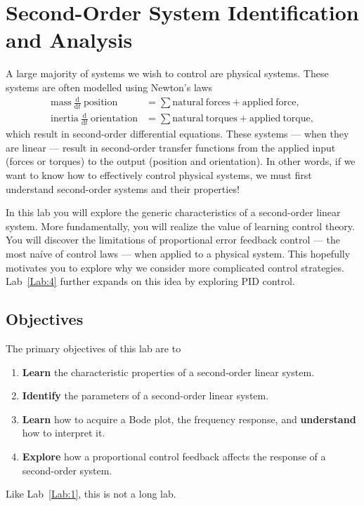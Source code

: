 \chapter{Second-Order System Identification and Analysis}\label{Lab:2}
A large majority of systems we wish to control are physical systems. These
systems are often modelled using Newton's laws
\[
\begin{aligned}
  \mathrm{mass}~\frac{\mathrm d}{\mathrm{d}t}~\mathrm{position}
    &= \sum \mathrm{natural~forces} + \mathrm{applied~force},\\
  \mathrm{inertia}~\frac{\mathrm d}{\mathrm{d}t}~\mathrm{orientation}
    &= \sum \mathrm{natural~torques} + \mathrm{applied~torque},
\end{aligned}
\]
which result in second-order differential equations. These systems --- when
they are linear --- result in second-order transfer functions from the
applied input (forces or torques) to the output (position and orientation).
In other words, if we want to know how to effectively control physical systems,
we must first understand second-order systems and their properties!

In this lab you will explore the generic characteristics of a second-order
linear system. More fundamentally, you will realize the value of learning
control theory. You will discover the limitations of proportional error
feedback control --- the most na\'ive of control laws --- when applied to
a physical system. This hopefully motivates you to explore why we consider
more complicated control strategies. Lab~\ref{Lab:4} further expands on this
idea by exploring PID control.

\section{Objectives}
The primary objectives of this lab are to
\begin{enumerate}[label=(\arabic*)]
  \item{
    \textbf{Learn} the characteristic properties of a second-order linear
    system.
  }
  \item{
    \textbf{Identify} the parameters of a second-order linear system.
  }
  \item{
    \textbf{Learn} how to acquire a Bode plot, the frequency response,
    and \textbf{understand} how to interpret it.
  }
  \item{
    \textbf{Explore} how a proportional control feedback affects the response
    of a second-order system.
  }
\end{enumerate}
Like Lab~\ref{Lab:1}, this is not a long lab.

